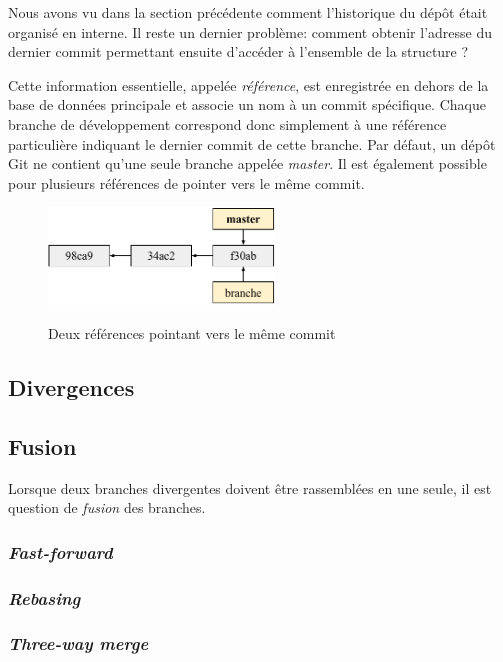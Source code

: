 \documentclass[11pt,a4paper]{article}
\begin{document}
Nous avons vu dans la section précédente comment l'historique du dépôt était organisé en interne. Il reste un dernier problème: comment obtenir l'adresse du dernier commit permettant ensuite d'accéder à l'ensemble de la structure ?

Cette information essentielle, appelée \textit{référence}, est enregistrée en dehors de la base de données principale et associe un nom à un commit spécifique. Chaque branche de développement correspond donc simplement à une référence particulière indiquant le dernier commit de cette branche. Par défaut, un dépôt Git ne contient qu'une seule branche appelée \textit{master}. Il est également possible pour plusieurs références de pointer vers le même commit.

\begin{figure}[h]
\begin{center}
\includegraphics[width=6cm]{img_refs} \cite{progit}
\caption{Deux références pointant vers le même commit}
\end{center}
\end{figure}

\subsection{Divergences}

\subsection{Fusion}

Lorsque deux branches divergentes doivent être rassemblées en une seule, il est question de \textit{fusion} des branches.

\subsubsection{\textit{Fast-forward}}

\subsubsection{\textit{Rebasing}}

\subsubsection{\textit{Three-way merge}}
\end{document}

